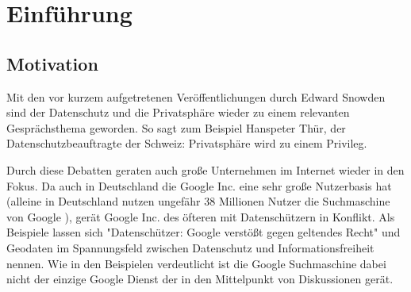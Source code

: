 %
% 

\chapter{Einführung}


\section{Motivation}
Mit den vor kurzem aufgetretenen Veröffentlichungen durch Edward Snowden sind der Datenschutz und die Privatsphäre wieder zu einem relevanten Gesprächsthema geworden. So sagt zum Beispiel Hanspeter Thür, der Datenschutzbeauftragte der Schweiz: \glqq Privatsphäre wird zu einem Privileg\grqq \cite{nzzdatenschutzprivileg}.

Durch diese Debatten geraten auch große Unternehmen im Internet wieder in den Fokus. Da auch in Deutschland die Google Inc. eine sehr große Nutzerbasis hat (alleine in Deutschland nutzen ungefähr 38 Millionen Nutzer die Suchmaschine von Google \cite{statistagoogle}), gerät Google Inc. des öfteren mit Datenschützern in Konflikt. Als Beispiele lassen sich  "Datenschützer: Google verstößt gegen geltendes Recht" \cite{gulligooglegeltendesrecht} und \glqq Geodaten im Spannungsfeld zwischen Datenschutz und Informationsfreiheit \cite{geodata} nennen. Wie in den Beispielen verdeutlicht ist die Google Suchmaschine dabei nicht der einzige Google Dienst der in den Mittelpunkt von Diskussionen gerät.

